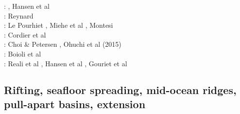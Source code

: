 {\twothousandeleven: \cite{lell11}\cite{kemk11}, Hansen et al \cite{hazk11}\\
\twothousandtwelve: Reynard \cite{reyn12}\\
\twothousandthirteen: Le Pourhiet \cite{lepo13}, Miehe et al \cite{miam13}, Montesi \cite{mont13}\\
\twothousandfourteen: Cordier et al \cite{codb14}\\
\twothousandfifteen: Choi \& Petersen \cite{chpe15}, Ohuchi et al (2015) \cite{ohkh15}\\
\twothousandseventeen: Boioli et al \cite{bocc17}\\
\twothousandnineteen: Reali et al \cite{rejv19}, Hansen et al \cite{hakt19}, Gouriet et al \cite{gocg19}
}

\subsection{Rifting, seafloor spreading, mid-ocean ridges, pull-apart basins, extension}

